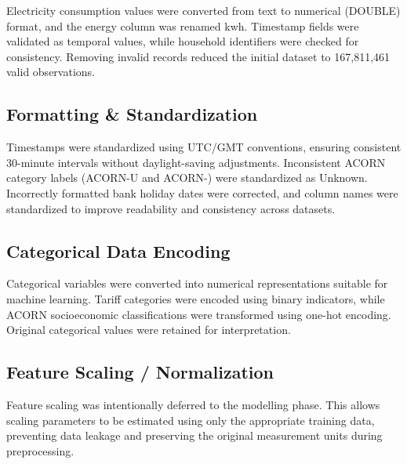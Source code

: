 \documentclass[11pt,letterpaper]{article}
\begin{document}
Electricity consumption values were converted from text to numerical
(DOUBLE) format, and the energy column was renamed kwh. Timestamp
fields were validated as temporal values, while household identifiers
were checked for consistency. Removing invalid records reduced the
initial dataset to 167,811,461 valid observations.

\subsection{Formatting \& Standardization}
\label{sec:formatting}

Timestamps were standardized using UTC/GMT conventions, ensuring
consistent 30-minute intervals without daylight-saving adjustments.
Inconsistent ACORN category labels (ACORN-U and ACORN-) were
standardized as Unknown. Incorrectly formatted bank holiday dates were
corrected, and column names were standardized to improve readability and
consistency across datasets.

\subsection{Categorical Data Encoding}
\label{sec:encoding}

Categorical variables were converted into numerical representations
suitable for machine learning. Tariff categories were encoded using
binary indicators, while ACORN socioeconomic classifications were
transformed using one-hot encoding. Original categorical values were
retained for interpretation.

\subsection{Feature Scaling / Normalization}
\label{sec:scaling}

Feature scaling was intentionally deferred to the modelling phase. This
allows scaling parameters to be estimated using only the appropriate
training data, preventing data leakage and preserving the original
measurement units during preprocessing.
\end{document}
